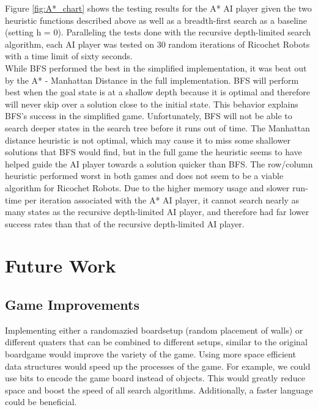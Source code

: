 \documentclass[a4paper,10pt]{article}
\begin{document}
  Figure \ref{fig:A*_chart} shows the testing results for the A* AI player given the two heuristic functions described above as well as a breadth-first search as a
  baseline (setting h = 0).  Paralleling the tests done with the recursive depth-limited search algorithm, each AI player was tested on 30 random iterations of Ricochet
  Robots with a time limit of sixty seconds. \\
  While BFS performed the best in the simplified implementation, it was beat out by the A* - Manhattan Distance in the full implementation.  BFS will perform best when
  the goal state is at a shallow depth because it is optimal and therefore will never skip over a solution close to the initial state.  This behavior explains BFS's
  success in the simplified game.  Unfortunately, BFS will not be able to search deeper states in the search tree before it runs out of time.  The Manhattan distance
  heuristic is not optimal, which may cause it to miss some shallower solutions that BFS would find, but in the full game the heuristic seems to have helped guide the AI
  player towards a solution quicker than BFS.  The row/column heuristic performed worst in both games and does not seem to be a viable algorithm for Ricochet Robots.
  Due to the higher memory usage and slower run-time per iteration associated with the A* AI player, it cannot search nearly as many states as the recursive depth-limited
  AI player, and therefore had far lower success rates than that of the recursive depth-limited AI player.

\section{Future Work}
\label{sec:futureWork}

  \subsection{Game Improvements}
  Implementing either a randomazied boardsetup (random placement of walls) or different quaters that can be combined to different setups, similar to the original boardgame would improve the variety of the game. Using more space efficient data structures would speed up the processes of the game. For example, we could use bits to encode the game board instead of objects. This would greatly reduce space and boost the speed of all search algorithms. Additionally, a faster language could be beneficial.
\end{document}
